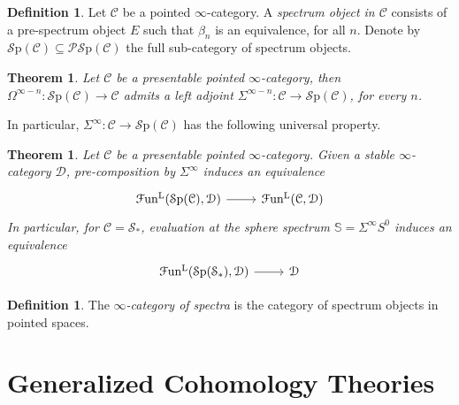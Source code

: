 \documentclass[a4paper]{book}
\newcommand{\lC}{\mathcal{C}}
\newcommand{\lD}{\mathcal{D}}
\newcommand{\lF}{\mathcal{F}}
\newcommand{\mL}{\mathrm{L}}
\newcommand{\lP}{\mathcal{P}}
\newcommand{\lS}{\mathcal{S}}
\newcommand{\bS}{\mathbb{S}}
\newcommand{\Fun}{\lF\mathrm{un}} %
\newcommand{\PSp}{\lP\Sp} %
\newcommand{\Sp}{\lS\mathrm{p}} %
\newtheorem{theorem}[equation]{Theorem}
\theoremstyle{definition}
\newtheorem{definition}[equation]{Definition}
\theoremstyle{remark}
\numberwithin{equation}{section}
\begin{document}
\begin{definition}
  Let $\lC$ be a pointed $\infty$-category. A \emph{spectrum object in $\lC$} consists of a pre-spectrum object $E$ such that $\beta_n$ is an equivalence, for all $n$. Denote by $\Sp(\lC)\subseteq\PSp(\lC)$ the full sub-category of spectrum objects. 
\end{definition}
\begin{theorem}
  Let $\lC$ be a presentable pointed $\infty$-category, then $\Omega^{\infty-n}:\Sp(\lC)\to\lC$ admits a left adjoint $\Sigma^{\infty-n}:\lC\to\Sp(\lC)$, for every $n$. 
\end{theorem}
In particular, $\Sigma^\infty:\lC\to\Sp(\lC)$ has the following universal property. 
\begin{theorem}
 Let $\lC$ be a presentable pointed $\infty$-category. Given a stable $\infty$-category $\lD$, pre-composition by $\Sigma^\infty$ induces an equivalence 
 \begin{equation}
  \begin{tikzcd}
    \Fun^\mL(\Sp(\lC),\lD) \arrow[r] & \Fun^\mL(\lC,\lD)
  \end{tikzcd}
 \end{equation}In particular, for $\lC=\lS_*$, evaluation at the \emph{sphere spectrum} $\bS=\Sigma^\infty S^0$ induces an equivalence
 \begin{equation}
  \begin{tikzcd}
    \Fun^\mL(\Sp(\lS_*),\lD) \arrow[r] & \lD
  \end{tikzcd}
 \end{equation}
\end{theorem}
\begin{definition}
  The \emph{$\infty$-category of spectra} is the category of spectrum objects in pointed spaces. 
\end{definition}

\section{Generalized Cohomology Theories}
\end{document}
